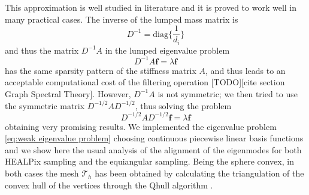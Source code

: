 This approximation is well studied in literature and it is proved to work well in many practical cases. The inverse of the lumped mass matrix is 
\begin{equation}\label{eq:inversed lumped}
D^{-1} = \text{diag}\{\frac{1}{d_i}\}
\end{equation}
and thus the matrix $D^{-1}A$ in the lumped eigenvalue problem 
\begin{equation}\label{eq:lumped eigenvalue problem}
	D^{-1}A\mathbf f = \lambda \mathbf f
\end{equation}
has the same sparsity pattern of the stiffness matrix $A$, and thus leads to an acceptable computational cost of the filtering operation [TODO][cite section Graph Spectral Theory]. However, $D^{-1}A$ is not symmetric; we then tried to use the symmetric matrix $D^{-1/2}AD^{-1/2}$, thus solving the problem 
\begin{equation}\label{eq:symmetric lumped eigenvalue problem}
D^{-1/2}AD^{-1/2}\mathbf f = \lambda \mathbf f
\end{equation}
obtaining very promising results.
We implemented the eigenvalue problem \ref{eq:weak eigenvalue problem} choosing continuous piecewise linear basis functions and we show here the usual analysis of the alignment of the eigenmodes for both HEALPix sampling and the equiangular sampling. Being the sphere convex, in both cases the mesh $\mathcal T_h$ has been obtained by calculating the triangulation of the convex hull of the vertices through the Qhull algorithm \cite{Barber96thequickhull}.

